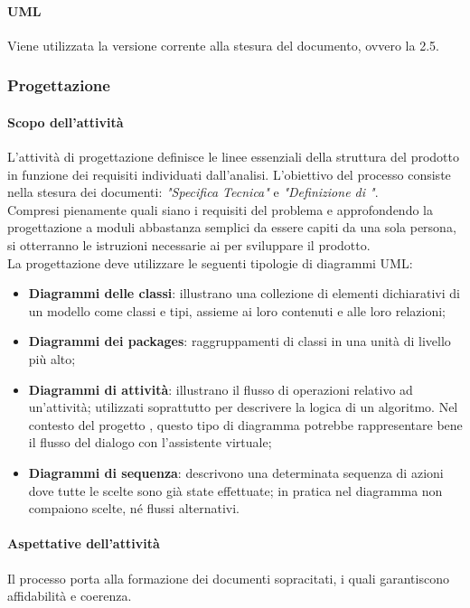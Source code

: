  \paragraph{UML}
 Viene utilizzata la versione corrente alla stesura del documento, ovvero la 2.5.
 \subsubsection{Progettazione}\label{progettazione}
 \paragraph{Scopo dell'attività}
 L'attività di progettazione definisce le linee essenziali della struttura del prodotto  in
 funzione dei requisiti individuati dall'analisi. L'obiettivo del processo consiste nella stesura dei
 documenti: \textit{"Specifica Tecnica"} e \textit{"Definizione di "}. \\
 Compresi pienamente quali siano i requisiti del problema e approfondendo la progettazione a moduli
 abbastanza semplici da essere capiti da una sola persona, si otterranno le
 istruzioni necessarie ai \PRP{} per sviluppare il prodotto.\\
 La progettazione deve utilizzare le seguenti tipologie di diagrammi UML:
 \begin{itemize}
 	\item \textbf{Diagrammi delle classi}: illustrano una collezione di elementi dichiarativi di un modello	come classi e tipi, assieme ai loro contenuti e alle loro relazioni;
 	\item \textbf{Diagrammi dei packages}: raggruppamenti di classi in una unità di livello più alto;
 	\item \textbf{Diagrammi di attività}: illustrano il flusso di operazioni relativo ad un’attività; utilizzati	soprattutto per descrivere la logica di un algoritmo. Nel contesto del progetto \PROGETTO, questo tipo di diagramma potrebbe rappresentare bene il flusso del dialogo con l'assistente virtuale;
 	\item \textbf{Diagrammi di sequenza}: descrivono una determinata sequenza di azioni dove tutte le
 	scelte sono già state effettuate; in pratica nel diagramma non compaiono scelte, né flussi
 	alternativi.
 \end{itemize}
 \paragraph{Aspettative dell'attività}
 Il processo porta alla formazione dei documenti sopracitati, i quali garantiscono affidabilità e
 coerenza.
